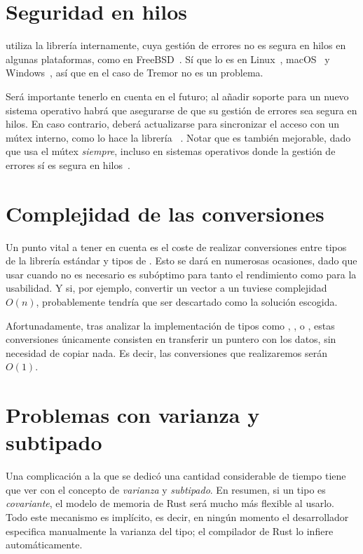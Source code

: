 \section{Seguridad en hilos}

\abistable utiliza la librería  internamente, cuya gestión
de errores no es segura en hilos en algunas plataformas, como  en
FreeBSD~\cite{hardplugins3}\cite{thsafe_openbsd}. Sí que lo es en
Linux~\cite{thsafe_linux}, macOS~\cite{thsafe_macos} y Windows~\cite{thsafe_ms},
así que en el caso de Tremor no es un problema.

Será importante tenerlo en cuenta en el futuro; al añadir soporte para un nuevo
sistema operativo habrá que asegurarse de que su gestión de errores sea segura
en hilos. En caso contrario, deberá actualizarse  para
sincronizar el acceso con un mútex interno, como lo hace la librería
~\cite{thsafe_dlopen}. Notar que  es también
mejorable, dado que usa el mútex \emph{siempre}, incluso en sistemas operativos
donde la gestión de errores sí es segura en hilos~\cite{thsafe_dlopen_issue}.

\section{Complejidad de las conversiones}\label{abiperf}

Un punto vital a tener en cuenta es el coste de realizar conversiones entre
tipos de la librería estándar y tipos de \abistable. Esto se dará en numerosas
ocasiones, dado que usar \abistable cuando no es necesario es subóptimo para
tanto el rendimiento como para la usabilidad. Y si, por ejemplo, convertir un
vector  a un  tuviese complejidad $O(n)$,
probablemente \abistable tendría que ser descartado como la solución escogida.

Afortunadamente, tras analizar la implementación de tipos como ,
,  o , estas conversiones únicamente
consisten en transferir un puntero con los datos, sin necesidad de copiar nada.
Es decir, las conversiones que realizaremos serán $O(1)$.

\section{Problemas con varianza y subtipado}

Una complicación a la que se dedicó una cantidad considerable de tiempo tiene
que ver con el concepto de \emph{varianza} y \emph{subtipado}. En resumen, si un
tipo es \emph{covariante}, el modelo de memoria de Rust será mucho más flexible
al usarlo. Todo este mecanismo es implícito, es decir, en ningún momento el
desarrollador especifica manualmente la varianza del tipo; el compilador de Rust
lo infiere automáticamente.

